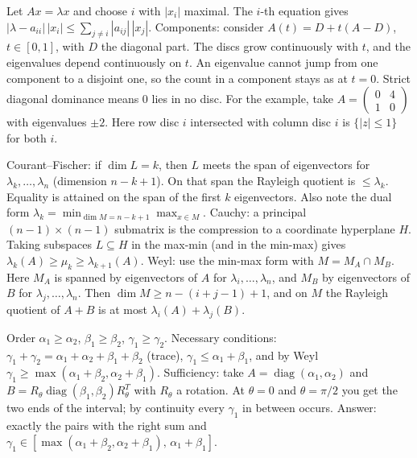 \documentclass[11pt,a4paper]{article}
\begin{document}

Let \(Ax=\lambda x\) and choose \(i\) with \(|x_i|\) maximal. The \(i\)-th equation gives \(|\lambda-a_{ii}|\,|x_i|\le\sum_{j\ne i}|a_{ij}|\,|x_j|\).
Components: consider \(A(t)=D+t(A-D)\), \(t\in[0,1]\), with \(D\) the diagonal part. The discs grow continuously with \(t\), and the eigenvalues depend continuously on \(t\). An eigenvalue cannot jump from one component to a disjoint one, so the count in a component stays as at \(t=0\). Strict diagonal dominance means \(0\) lies in no disc.
For the example, take \(A=\begin{pmatrix}0&4\\1&0\end{pmatrix}\) with eigenvalues \(\pm2\). Here row disc \(i\) intersected with column disc \(i\) is \(\{|z|\le1\}\) for both \(i\).

Courant--Fischer: if \(\dim L=k\), then \(L\) meets the span of eigenvectors for \(\lambda_k,\dots,\lambda_n\) (dimension \(n-k+1\)). On that span the Rayleigh quotient is \(\le\lambda_k\). Equality is attained on the span of the first \(k\) eigenvectors. Also note the dual form \(\lambda_k=\min_{\dim M=n-k+1}\max_{x\in M}\).
Cauchy: a principal \((n-1)\times(n-1)\) submatrix is the compression to a coordinate hyperplane \(H\). Taking subspaces \(L\subseteq H\) in the max-min (and in the min-max) gives \(\lambda_k(A)\ge\mu_k\ge\lambda_{k+1}(A)\).
Weyl: use the min-max form with \(M=M_A\cap M_B\). Here \(M_A\) is spanned by eigenvectors of \(A\) for \(\lambda_i,\dots,\lambda_n\), and \(M_B\) by eigenvectors of \(B\) for \(\lambda_j,\dots,\lambda_n\). Then \(\dim M\ge n-(i+j-1)+1\), and on \(M\) the Rayleigh quotient of \(A+B\) is at most \(\lambda_i(A)+\lambda_j(B)\).

Order \(\alpha_1\ge\alpha_2\), \(\beta_1\ge\beta_2\), \(\gamma_1\ge\gamma_2\). Necessary conditions: \(\gamma_1+\gamma_2=\alpha_1+\alpha_2+\beta_1+\beta_2\) (trace), \(\gamma_1\le\alpha_1+\beta_1\), and by Weyl \(\gamma_1\ge\max(\alpha_1+\beta_2,\alpha_2+\beta_1)\).
Sufficiency: take \(A=\operatorname{diag}(\alpha_1,\alpha_2)\) and \(B=R_\theta\operatorname{diag}(\beta_1,\beta_2)R_\theta^T\) with \(R_\theta\) a rotation. At \(\theta=0\) and \(\theta=\pi/2\) you get the two ends of the interval; by continuity every \(\gamma_1\) in between occurs. Answer: exactly the pairs with the right sum and \(\gamma_1\in[\max(\alpha_1+\beta_2,\alpha_2+\beta_1),\,\alpha_1+\beta_1]\).
\end{document}
